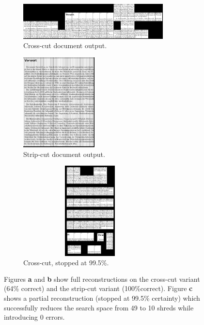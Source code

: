 \documentclass[letterpaper]{article}
\begin{document}
\begin{figure}[h]
\setlength{\abovecaptionskip}{1pt plus 1.0pt minus 2.0pt}

    \centering
    \begin{subfigure}[b]{0.48\textwidth}
        \setlength{\abovecaptionskip}{0pt plus 1.0pt minus 2.0pt}
        \centering
        \includegraphics[width=\textwidth,height=1.9cm,natwidth=610,natheight=642]{prim7x7BW.jpg}
        \caption{Cross-cut document output.}
    \end{subfigure}
    \begin{subfigure}[b]{0.23\textwidth}
        \setlength{\abovecaptionskip}{0pt plus 1.0pt minus 2.0pt}
        \centering
        \includegraphics[width=\textwidth,height=4.9cm,natwidth=610,natheight=642]{prim1x49BW.jpg}
        \caption{Strip-cut document output.}
    \end{subfigure}
    \begin{subfigure}[b]{0.23\textwidth}
        \setlength{\abovecaptionskip}{0pt plus 1.0pt minus 2.0pt}
        \centering
        \includegraphics[width=0.8\textwidth,height=4.9cm,natwidth=610,natheight=642]{stopped7x7BW.jpg}
        \caption{Cross-cut, stopped at 99.5\%.}
    \end{subfigure}
     \caption{Figures {\bf a} and {\bf b} show full reconstructions on the cross-cut variant (64\% correct) and the strip-cut variant (100\%correct). Figure {\bf c} shows a partial reconstruction (stopped at 99.5\% certainty) which successfully reduces the search space from 49 to 10 shreds while introducing 0 errors.}
    \label{fig:searchRez}
\end{figure}
\end{document}
